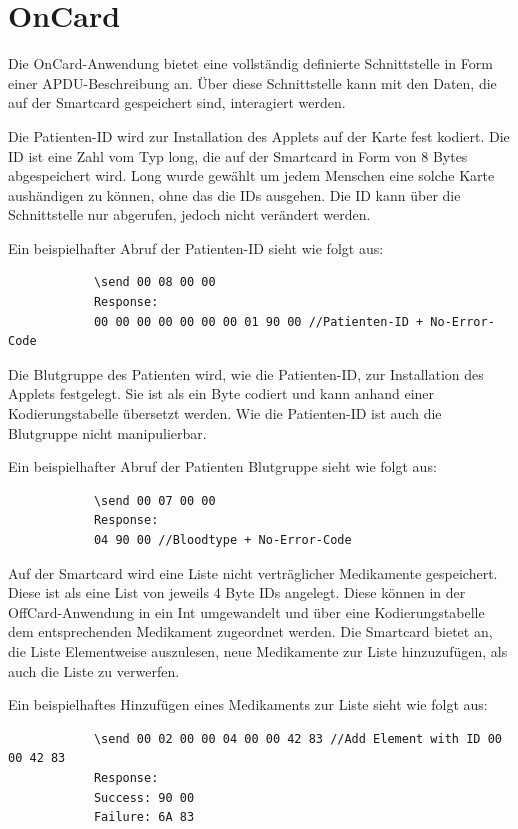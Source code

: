 \documentclass[parskip]{scrartcl}
\begin{document}
	\section{OnCard}
		Die OnCard-Anwendung bietet eine vollständig definierte Schnittstelle in Form einer APDU-Beschreibung an. Über diese Schnittstelle kann mit den Daten, die auf der Smartcard gespeichert sind, interagiert werden.
		
		Die Patienten-ID wird zur Installation des Applets auf der Karte fest kodiert. Die ID ist eine Zahl vom Typ long, die auf der Smartcard in Form von 8 Bytes abgespeichert wird. Long wurde gewählt um jedem Menschen eine solche Karte aushändigen zu können, ohne das die IDs ausgehen. Die ID kann über die Schnittstelle nur abgerufen, jedoch nicht verändert werden.
		
		Ein beispielhafter Abruf der Patienten-ID sieht wie folgt aus:
		
		\begin{lstlisting}
			\send 00 08 00 00
			Response:
			00 00 00 00 00 00 00 01 90 00 //Patienten-ID + No-Error-Code
		\end{lstlisting}
		
		Die Blutgruppe des Patienten wird, wie die Patienten-ID, zur Installation des Applets festgelegt. Sie ist als ein Byte codiert und kann anhand einer Kodierungstabelle übersetzt werden. Wie die Patienten-ID ist auch die Blutgruppe nicht manipulierbar.
		
		Ein beispielhafter Abruf der Patienten Blutgruppe sieht wie folgt aus:
		
		\begin{lstlisting}
			\send 00 07 00 00
			Response:
			04 90 00 //Bloodtype + No-Error-Code
		\end{lstlisting}
		
		Auf der Smartcard wird eine Liste nicht verträglicher Medikamente gespeichert. Diese ist als eine List von jeweils 4 Byte IDs angelegt. Diese können in der OffCard-Anwendung in ein Int umgewandelt und über eine Kodierungstabelle dem entsprechenden Medikament zugeordnet werden. Die Smartcard bietet an, die Liste Elementweise auszulesen, neue Medikamente zur Liste hinzuzufügen, als auch die Liste zu verwerfen.
		
		Ein beispielhaftes Hinzufügen eines Medikaments zur Liste sieht wie folgt aus:
		
		\begin{lstlisting}
			\send 00 02 00 00 04 00 00 42 83 //Add Element with ID 00 00 42 83
			Response:
			Success: 90 00
			Failure: 6A 83
		\end{lstlisting}
		
\end{document}
